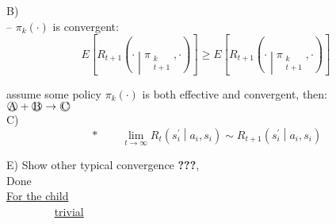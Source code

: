 B)\\
\boxed{$\textasteriskcentered$} -- $\pi_k(\cdot)$ is convergent:
\begin{equation*}
E\left[ R_{t+1}\left( \cdot \middle| \pi_{\substack{k\\t+1}},\cdot\right)\right] \ge E\left[ R_{t+1}\left( \cdot \middle| \pi_{\substack{k\\t+1}},\cdot\right)\right]
\end{equation*}

 assume some policy $\pi_k(\cdot)$ is both effective and convergent, then:\\
$\circled{\text{A}}+\circled{\text{B}}\rightarrow\circled{\text{C}}$\\

C)\\

\begin{equation*}
\boxed{\ast}\qquad \lim_{t\rightarrow\infty} R_t\left( s^\prime_i \middle| a_i, s_i \right) \sim R_{t+1}\left( s^\prime_i \middle| a_i, s_i \right)
\end{equation*}

E) Show other typical convergence \textbf{???},\\

Done\\

\underline{For the child}\\

\boxed{$\textasteriskcentered$}$\qquad\qquad$ \underline{trivial}


